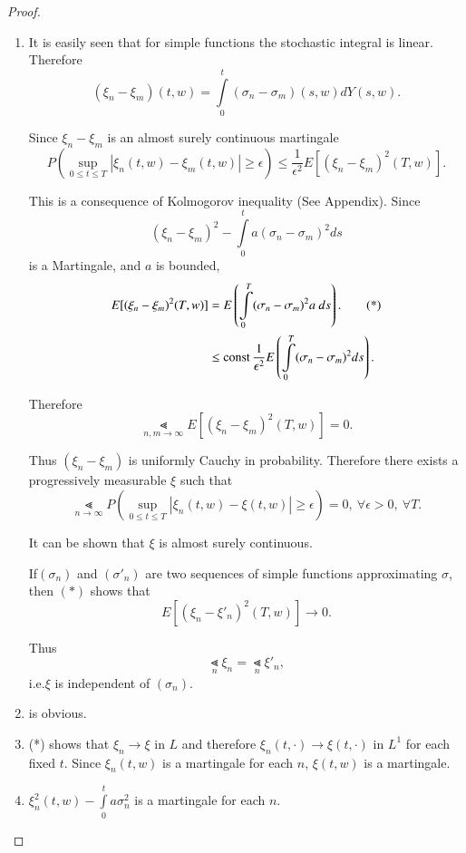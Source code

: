 \begin{proof}
\begin{enumerate}
\renewcommand{\theenumi}{\roman{enumi}}
\renewcommand{\labelenumi}{(\theenumi)}
\item It is easily seen that for simple functions the stochastic
  integral is linear. Therefore
$$
(\xi_{n}-\xi_{m})(t,w)=\int\limits^{t}_{0}(\sigma_{n}-\sigma_{m})(s,w)dY(s,w).
$$

Since $\xi_{n}-\xi_{m}$ is an almost surely continuous martingale
$$
P\left(\sup\limits_{0\leq t\leq T}|\xi_{n}(t,w)-\xi_{m}(t,w)|\geq
\epsilon\right)\leq \frac{1}{\epsilon^{2}}E[(\xi_{n}-\xi_{m})^{2}(T,w)].
$$

This is a consequence of Kolmogorov inequality (See Appendix). Since
$$
(\xi_{n}-\xi_{m})^{2}-\int\limits^{t}_{0}a(\sigma_{n}-\sigma_{m})^{2}ds
$$
is a Martingale, and $a$ is bounded,
\begin{align*}
E[(\xi_{n}-\xi_{m})^{2}(T,w)] &=
E\left(\int\limits^{T}_{0}(\sigma_{n}-\sigma_{m})^{2}a\ ds\right).\tag{*}\\
&\leq \text{const\,}\frac{1}{\epsilon^{2}}E\left(\int\limits^{T}_{0}(\sigma_{n}-\sigma_{m})^{2}ds\right).
\end{align*}

Therefore
$$
\Lt\limits_{n,m\to \infty}E[(\xi_{n}-\xi_{m})^{2}(T,w)]=0.
$$

Thus $(\xi_{n}-\xi_{m})$ is uniformly Cauchy in probability. Therefore
there exists a progressively measurable $\xi$ such that 
$$
\Lt\limits_{n\to\infty}P\left(\sup\limits_{0\leq t\leq
  T}|\xi_{n}(t,w)-\xi(t,w)|\geq \epsilon\right)=0,\ \forall
\epsilon>0,\ \forall T.
$$

It can be shown that $\xi$ is almost surely continuous.

If\pageoriginale $(\sigma_{n})$ and $(\sigma'_{n})$ are two sequences
of simple functions approximating $\sigma$, then $(*)$ shows that
$$
E[(\xi_{n}-\xi'_{n})^{2}(T,w)]\to 0.
$$

Thus
$$
\Lt\limits_{n}\xi_{n}=\Lt\limits_{n}\xi'_{n},
$$
i.e.\@ $\xi$ is independent of $(\sigma_{n})$.

\item is obvious.

\item (*) shows that $\xi_{n}\to \xi$ in $L$ and therefore
  $\xi_{n}(t,\cdot)\to \xi(t,\cdot)$ in $L^{1}$ for each fixed
  $t$. Since $\xi_{n}(t,w)$ is a martingale for each $n$, $\xi(t,w)$
  is a martingale.

\item $\xi^{2}_{n}(t,w)-\int\limits^{t}_{0}a\sigma^{2}_{n}$ is a
  martingale for each $n$.



\end{enumerate}
\end{proof}
